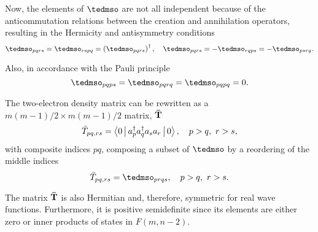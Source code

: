 Now, the elements of $ \mat{\tedmso}$ are not all independent because of the
anticommutation relations between the creation and annihilation operators,
resulting in the Hermicity and antisymmetry conditions
\begin{equation}
    \tedmso_{pqrs} = \tedmso_{rspq} = \left( \tedmso_{pqrs} \right)^{\dagger}
    , \quad
    \tedmso_{pqrs} = - \tedmso_{rqps} = - \tedmso_{ps rq}
    .
\end{equation}

Also, in accordance with the Pauli principle 
\begin{equation}
    \tedmso_{pqps} = \tedmso_{pqrq} = \tedmso_{pqpq} = 0
    .
\end{equation}

The two-electron density matrix can be rewritten as a
$m\left( m-1 \right) /2 \times m\left( m-1 \right) /2$ 
matrix, $ \boldsymbol{\mathrm{\bar{T}}}$ 
\begin{equation}
    \bar{T}_{pq,rs} = \Braket{0 | a_p^{\dagger} a_q^{\dagger} a_s a_r | 0}
    , \quad
    p>q,\ r>s
    ,
\end{equation}
with composite indices $pq$, composing a subset of $ \mat{\tedmso}$ by a
reordering of the middle indices 
\begin{equation}
    \bar{T}_{pq,rs} = \tedmso_{prqs}
    , \quad
    p>q,\ r>s
    .
\end{equation}

The matrix $ \boldsymbol{\mathrm{\bar{T}}}$ is also Hermitian and, therefore, symmetric for real
wave functions.
Furthermore, it is positive semidefinite since its elements are either zero
or inner products of states in $F\left( m, n-2 \right)$.

